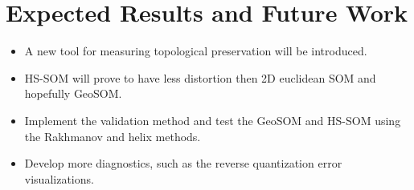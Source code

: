 \documentclass[12pt]{article}
\begin{document}
\section{Expected Results and Future Work}
\begin{itemize}
\item A new tool for measuring topological preservation will be introduced.
\item HS-SOM will prove to have less distortion then 2D euclidean SOM and hopefully GeoSOM.
\item Implement the validation method and test the GeoSOM and HS-SOM using the Rakhmanov and helix methods.
\item Develop more diagnostics, such as the reverse quantization error visualizations.
\end{itemize}



\end{document}
